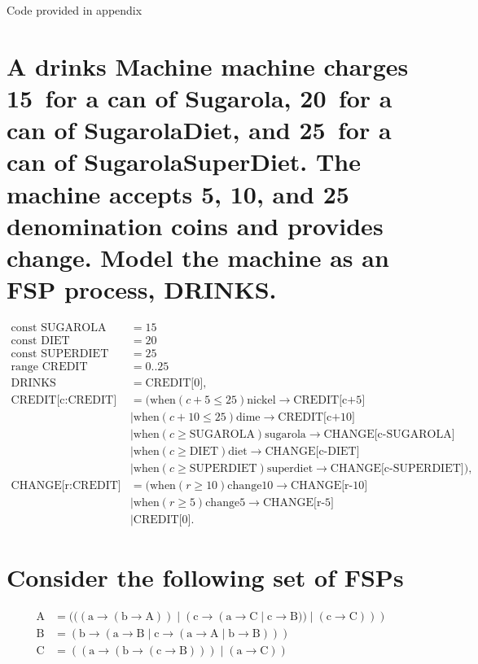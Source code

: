 \documentclass{article}[8pt]
\begin{document}
Code provided in appendix

\section[Question ~\thesection]{A drinks Machine machine charges 15\textcent $\,$ for a can of Sugarola, 20\textcent $\,$ for a can of SugarolaDiet, and 25\textcent $\,$ for a can of SugarolaSuperDiet. The machine accepts 5\textcent, 10\textcent, and 25\textcent $\,$ denomination coins and provides change. Model the machine as an FSP process, DRINKS.}

\begin{align*}
	\text{const SUGAROLA} &= 15 \\
	\text{const DIET} &= 20 \\
	\text{const SUPERDIET} &= 25 \\
	\text{range CREDIT} &= 0..25 \\
	\text{DRINKS} &= \text{CREDIT[0]}, \\
	\text{CREDIT[c:CREDIT]} &= (\text{when} (c + 5 \le 25) \text{nickel} \rightarrow \text{CREDIT[c+5]} \\
	&| \text{when} (c + 10 \le 25) \text{dime} \rightarrow \text{CREDIT[c+10]} \\
	&| \text{when} (c \ge \text{SUGAROLA}) \text{sugarola} \rightarrow \text{CHANGE[c-SUGAROLA]} \\
	&| \text{when} (c \ge \text{DIET}) \text{diet} \rightarrow \text{CHANGE[c-DIET]} \\
	&| \text{when} (c \ge \text{SUPERDIET}) \text{superdiet} \rightarrow \text{CHANGE[c-SUPERDIET]}
	), \\
	\text{CHANGE[r:CREDIT]} &= (\text{when} (r \ge 10)\text{change10} \rightarrow \text{CHANGE[r-10]} \\
	&| \text{when} (r \ge 5) \text{change5} \rightarrow \text{CHANGE[r-5]} \\
	&| \text{CREDIT[0]}.
\end{align*}

\section[Question ~\thesection]{Consider the following set of FSPs}

\begin{align*}
	\text{A} &= (((\text{a} \rightarrow (\text{b} \rightarrow \text{A})) \; | \; (\text{c} \rightarrow (\text{a} \rightarrow \text{C} \; | \; \text{c} \rightarrow \text{B})) \; | \; (\text{c} \rightarrow \text{C}))) \\
	\text{B} &= (\text{b} \rightarrow (\text{a} \rightarrow \text{B} \; | \; \text{c} \rightarrow (\text{a} \rightarrow \text{A} \; | \; \text{b} \rightarrow \text{B}))) \\
	\text{C} &= ((\text{a} \rightarrow (\text{b} \rightarrow (\text{c} \rightarrow \text{B}))) \; | \; (\text{a} \rightarrow \text{C}))
\end{align*}
\end{document}
